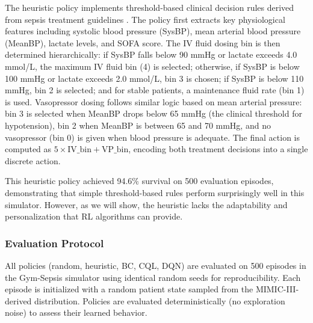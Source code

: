 The heuristic policy implements threshold-based clinical decision rules derived from sepsis treatment guidelines \citep{rhodes2017ssc}. The policy first extracts key physiological features including systolic blood pressure (SysBP), mean arterial blood pressure (MeanBP), lactate levels, and SOFA score. The IV fluid dosing bin is then determined hierarchically: if SysBP falls below 90 mmHg or lactate exceeds 4.0 mmol/L, the maximum IV fluid bin (4) is selected; otherwise, if SysBP is below 100 mmHg or lactate exceeds 2.0 mmol/L, bin 3 is chosen; if SysBP is below 110 mmHg, bin 2 is selected; and for stable patients, a maintenance fluid rate (bin 1) is used. Vasopressor dosing follows similar logic based on mean arterial pressure: bin 3 is selected when MeanBP drops below 65 mmHg (the clinical threshold for hypotension), bin 2 when MeanBP is between 65 and 70 mmHg, and no vasopressor (bin 0) is given when blood pressure is adequate. The final action is computed as $5 \times \text{IV\_bin} + \text{VP\_bin}$, encoding both treatment decisions into a single discrete action.

This heuristic policy achieved 94.6\% survival on 500 evaluation episodes, demonstrating that simple threshold-based rules perform surprisingly well in this simulator. However, as we will show, the heuristic lacks the adaptability and personalization that RL algorithms can provide.

\subsubsection{Evaluation Protocol}

All policies (random, heuristic, BC, CQL, DQN) are evaluated on 500 episodes in the Gym-Sepsis simulator using identical random seeds for reproducibility. Each episode is initialized with a random patient state sampled from the MIMIC-III-derived distribution. Policies are evaluated deterministically (no exploration noise) to assess their learned behavior.

